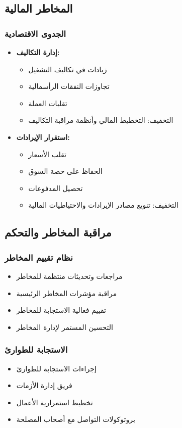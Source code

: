 \subsection{المخاطر المالية}

\subsubsection{الجدوى الاقتصادية}
\begin{itemize}
    \item \textbf{إدارة التكاليف:}
    \begin{itemize}
        \item زيادات في تكاليف التشغيل
        \item تجاوزات النفقات الرأسمالية
        \item تقلبات العملة
        \item التخفيف: التخطيط المالي وأنظمة مراقبة التكاليف
    \end{itemize}
    
    \item \textbf{استقرار الإيرادات:}
    \begin{itemize}
        \item تقلب الأسعار
        \item الحفاظ على حصة السوق
        \item تحصيل المدفوعات
        \item التخفيف: تنويع مصادر الإيرادات والاحتياطيات المالية
    \end{itemize}
\end{itemize}

\subsection{مراقبة المخاطر والتحكم}

\subsubsection{نظام تقييم المخاطر}
\begin{itemize}
    \item مراجعات وتحديثات منتظمة للمخاطر
    \item مراقبة مؤشرات المخاطر الرئيسية
    \item تقييم فعالية الاستجابة للمخاطر
    \item التحسين المستمر لإدارة المخاطر
\end{itemize}

\subsubsection{الاستجابة للطوارئ}
\begin{itemize}
    \item إجراءات الاستجابة للطوارئ
    \item فريق إدارة الأزمات
    \item تخطيط استمرارية الأعمال
    \item بروتوكولات التواصل مع أصحاب المصلحة
\end{itemize}
